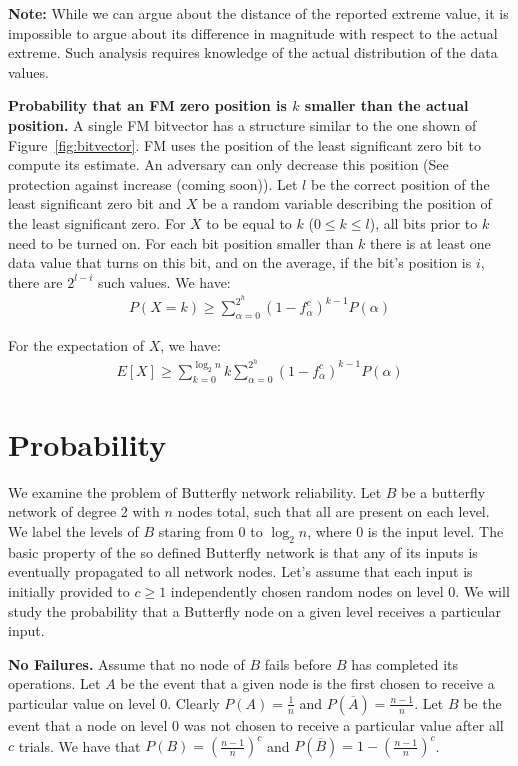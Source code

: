 \documentclass[11pt,twocolumn]{MyTightStyle}
\theoremstyle{plain}
\theoremstyle{definition}
\theoremstyle{remark}
\numberwithin{equation}{section}
\begin{document}
  {\bf Note:} While we can argue about the distance of the reported
  extreme value, it is impossible to argue about its difference in
  magnitude with respect to the actual extreme. Such analysis requires
  knowledge of the actual distribution of the data values.

  {\bf Probability that an FM zero position is $k$ smaller than the
  actual position.} A single FM bitvector has a structure similar to the one
  shown of Figure~\ref{fig:bitvector}. FM uses the position of the
  least significant zero bit to compute its estimate. An adversary can
  only decrease this position (See protection against increase (coming
  soon)). Let $l$ be the correct position of the least significant
  zero bit and $X$ be a random variable describing the position of the
  least significant zero. For $X$ to be equal to $k$ ($0\leq k \leq l$), all
  bits prior to $k$ need to be turned on. For each bit position smaller than $k$ there is at least one data
  value that turns on this bit, and on the average, if the bit's
  position is $i$, there are $2^{l-i}$ such values. We have:
  \begin{eqnarray}
    P(X=k) \geq \sum_{\alpha=0}^{2^h}(1-f_{\alpha}^c)^{k-1}P(\alpha)
  \end{eqnarray}

  For the expectation of $X$, we have:
  \begin{eqnarray}
    E[X] \geq \sum_{k=0}^{\log_2{n}}k\sum_{\alpha=0}^{2^h}(1-f_{\alpha}^c)^{k-1}P(\alpha)
  \end{eqnarray}






\section{Probability}

  We examine the problem of Butterfly network
  reliability. Let $B$ be a butterfly network of degree 2 with $n$
  nodes total, such that all are present on each level.  We label the
  levels of $B$ staring from 0 to $\log_2n$, where 0 is the input
  level. The basic property of the  so defined Butterfly network is
  that any of its inputs is eventually propagated 
  to all network nodes. Let's assume that each input is initially provided
  to $c \geq 1$ independently chosen random nodes on level 0. We will
  study the probability that a Butterfly node on a given level
  receives a particular input.

  {\bf No Failures.} Assume that no node of $B$ fails before $B$ has
  completed its operations. Let $A$ be the event that a given node is
  the first chosen to receive a particular value on level 0. Clearly $P(A) =
  \frac{1}{n}$ and $P(\overline{A}) = \frac{n-1}{n}$. Let $B$ be the
  event that a node on level 0 was not chosen to receive a particular
  value after all $c$ trials. We have that $P(B) =
  (\frac{n-1}{n})^c$ and $P(\overline{B}) = 1-(\frac{n-1}{n})^c$.
\end{document}
